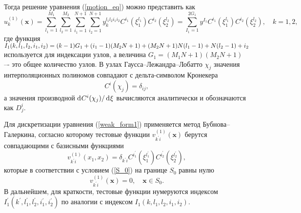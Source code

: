 \documentclass[press]{vestnik}
\begin{document}
Тогда решение уравнения (\ref{motion_eq}) можно представить как
\begin{equation} \label{u_1k}
	u_{k}^{(1)}(\bm{x})  =  \sum_{l_{1}=1}^{M_{1}} \sum_{l_{2}=1}^{M_{2}} \sum_{i_{1}=1}^{N+1} \sum_{i_{2}=1}^{N+1} y_{k}^{l_{1}l_{2}i_{1}i_{2}} C^{i_{1}}(\xi_{1}^{l_{1}}) C^{i_{2}}(\xi_{2}^{l_{2}})  = \sum_{I_{1}=1}^{2G_{1}} y^{I_{1}} C^{i_{1}}(\xi_{1}^{l_{1}}) C^{i_{2}}(\xi_{2}^{l_{2}}), \quad k=1, 2,
\end{equation}
где функция $I_1(k, l_1, l_2, i_1, i_2) = (k-1)G_{1}+(i_1-1)(M_{2}N+1) \dm + (M_{2} N +1)N(l_1-1)+N(l_2-1)+i_2$ используется для индексации узлов, а величина $G_1 =(M_{1}N+1)(M_{2}N+1)$ –- это общее количество узлов. В узлах Гаусса--Лежандра--Лобатто $\chi_{j}$ значения интерполяционных полиномов совпадают с дельта-символом Кронекера
$$
C^{i}(\chi_{j})=\delta_{ij},
$$
а значения производной $\d C^{i}(\chi_{j}) / \d \xi$ вычисляются аналитически \cite{Golub_2015} и обозначаются как $D_{j}^{i}$. 

Для дискретизации уравнения (\ref{weak_form1}) применяется метод Бубнова--Галеркина, согласно которому тестовые функции $v_{k^{'}i}^{(1)}(\bm{x})$ берутся совпадающими с базисными функциями
\begin{equation} \label{v_1}
	v_{k^{'}i}^{(1)}(x_1,x_2) = \delta_{k^{'}i} C^{i_{1}^{'}}(\xi_{1}^{l_{1}^{'}}) C^{i_{2}^{'}}(\xi_{2}^{l_{2}^{'}}), 
\end{equation}
которые в соответствии с условием (\ref{S_0}) на границе $S_{0}$ равны нулю
\begin{equation} \label{v_1_0}
	v_{k^{'}i}^{(1)}({\bm{x}}) = 0,\quad \bm{x} \in S_{0}.
\end{equation}
В дальнейшем, для краткости, тестовые функции нумеруются индексом $I_{1}^{'}(k^{'},l_{1}^{'},l_{2}^{'},i_{1}^{'},i_{2}^{'})$ по аналогии с индексом $I_1(k,l_1,l_2,i_1,i_2)$.
\end{document}
